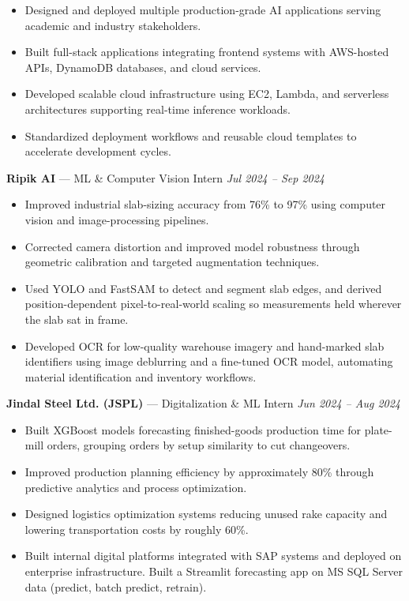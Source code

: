 \documentclass[a4paper,8pt]{extarticle}
\makeatletter
\newcommand{\v}[2]{%
  \edef\@vtmp{,\variant,}%
  \expandafter\in@\expandafter{\@vtmp}{,#1,}%
  \ifin@ #2\fi}
\makeatother
\begin{document}
\begin{itemize}
\item Designed and deployed multiple production-grade AI applications serving academic and industry stakeholders.
\item Built full-stack applications integrating frontend systems with AWS-hosted APIs, DynamoDB databases, and cloud services.
\item Developed scalable cloud infrastructure using EC2, Lambda, and serverless architectures supporting real-time inference workloads.
\item Standardized deployment workflows and reusable cloud templates to accelerate development cycles.
\end{itemize}

\noindent
\textbf{Ripik AI} --- ML \& Computer Vision Intern
\hfill \textit{Jul 2024 -- Sep 2024}

\begin{itemize}
\item Improved industrial slab-sizing accuracy from 76\% to 97\% using computer vision and image-processing pipelines.
\item Corrected camera distortion and improved model robustness through geometric calibration and targeted augmentation techniques.
\v{cv,ml}{\item Used YOLO and FastSAM to detect and segment slab edges, and derived position-dependent pixel-to-real-world scaling so measurements held wherever the slab sat in frame.}
\item Developed OCR for low-quality warehouse imagery and hand-marked slab identifiers using image deblurring and a fine-tuned OCR model, automating material identification and inventory workflows.
\end{itemize}

\noindent
\textbf{Jindal Steel Ltd. (JSPL)} --- Digitalization \& ML Intern
\hfill \textit{Jun 2024 -- Aug 2024}

\begin{itemize}
\item Built XGBoost models forecasting finished-goods production time for plate-mill orders, grouping orders by setup similarity to cut changeovers.
\item Improved production planning efficiency by approximately 80\% through predictive analytics and process optimization.
\item Designed logistics optimization systems reducing unused rake capacity and lowering transportation costs by roughly 60\%.
\item Built internal digital platforms integrated with SAP systems and deployed on enterprise infrastructure.\v{swe}{ Built a Streamlit forecasting app on MS SQL Server data (predict, batch predict, retrain).}
\end{itemize}
\end{document}
